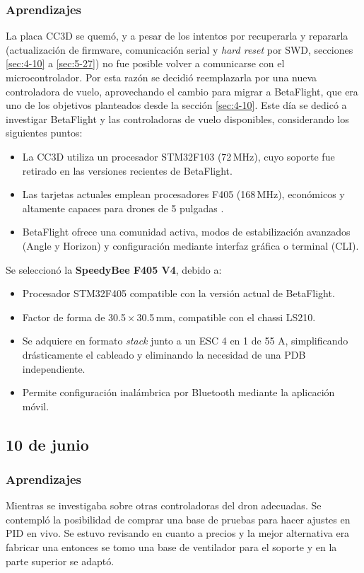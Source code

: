 \documentclass[pdflatex,sn-mathphys-num]{sn-jnl}%
\begin{document}
\subsubsection{Aprendizajes}
La placa CC3D se quemó, y a pesar de los intentos por recuperarla y repararla (actualización de firmware, comunicación serial y \textit{hard reset} por SWD, secciones \ref{sec:4-10} a \ref{sec:5-27}) no fue posible volver a comunicarse con el microcontrolador. Por esta razón se decidió reemplazarla por una nueva controladora de vuelo, aprovechando el cambio para migrar a BetaFlight, que era uno de los objetivos planteados desde la sección \ref{sec:4-10}. Este día se dedicó a investigar BetaFlight y las controladoras de vuelo disponibles, considerando los siguientes puntos:
\begin{itemize}
    \item La CC3D utiliza un procesador STM32F103 (72\,MHz), cuyo soporte fue retirado en las versiones recientes de BetaFlight.
    \item Las tarjetas actuales emplean procesadores F405 (168\,MHz), económicos y altamente capaces para drones de 5 pulgadas \cite{stm32ventajas}.
    \item BetaFlight ofrece una comunidad activa, modos de estabilización avanzados (Angle y Horizon) y configuración mediante interfaz gráfica o terminal (CLI).
\end{itemize}

Se seleccionó la \textbf{SpeedyBee F405 V4}, debido a:
\begin{itemize}
    \item Procesador STM32F405 compatible con la versión actual de BetaFlight.
    \item Factor de forma de 30.5\,$\times$\,30.5\,mm, compatible con el chassi LS210.
    \item Se adquiere en formato \textit{stack} junto a un ESC 4 en 1 de 55 A, simplificando drásticamente el cableado y eliminando la necesidad de una PDB independiente.
    \item Permite configuración inalámbrica por Bluetooth mediante la aplicación móvil.
\end{itemize}


\subsection{10 de junio}
\subsubsection{Aprendizajes}
Mientras se investigaba sobre otras controladoras del dron adecuadas. Se contempló la posibilidad de comprar una base de pruebas para hacer ajustes en PID en vivo. Se estuvo revisando en cuanto a precios y la mejor alternativa era fabricar una entonces se tomo una base de ventilador para el soporte y en la parte superior se adaptó.
\end{document}
